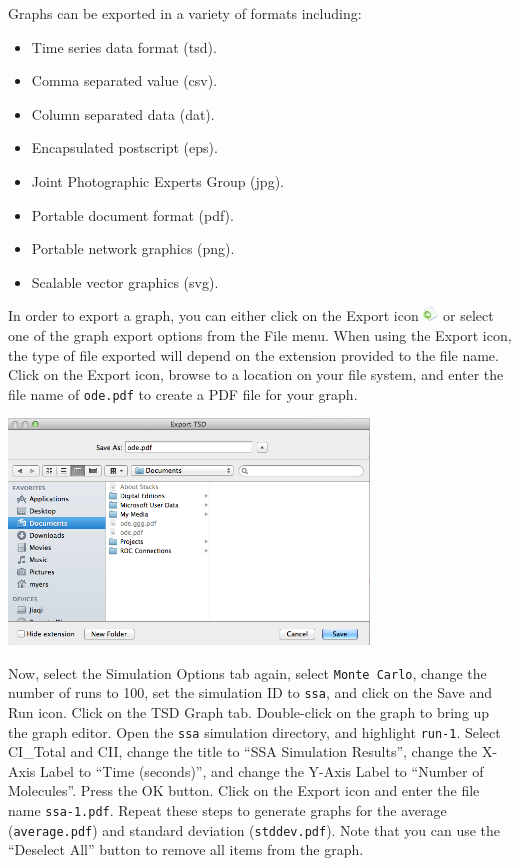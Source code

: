 \documentclass[titlepage,11pt]{article}
\begin{document}
Graphs can be exported in a variety of formats including:
\begin{itemize}
\item Time series data format (tsd).
\item Comma separated value (csv).
\item Column separated data (dat).
\item Encapsulated postscript (eps). 
\item Joint Photographic Experts Group (jpg). 
\item Portable document format (pdf).
\item Portable network graphics (png). 
\item Scalable vector graphics (svg).
\end{itemize}
In order to export a graph, you can either click on the Export icon \includegraphics{../gui/icons/export} or select one of the graph export options from the File menu.  When using the Export icon, the type of file exported will depend on the extension provided to the file name.  Click on the Export icon, browse to a location on your file system, and enter the file name of {\tt ode.pdf} to create a PDF file for your graph.

\begin{center}
\includegraphics[height=60mm]{screenshots/exportTSD}
\end{center}

Now, select the Simulation Options tab again, select {\tt Monte Carlo}, change the number of runs to 100, set the simulation ID to {\tt ssa}, and click on the Save and Run icon.  Click on the TSD Graph tab.  Double-click on the graph to bring up the graph editor.  Open the {\tt ssa} simulation directory, and highlight {\tt run-1}.  Select CI\_Total and CII, change the title to ``SSA Simulation Results'', change the X-Axis Label to ``Time (seconds)'', and change the Y-Axis Label to ``Number of Molecules''.  Press the OK button.  Click on the Export icon and enter the file name {\tt ssa-1.pdf}.  Repeat these steps to generate graphs for the average ({\tt average.pdf}) and standard deviation ({\tt stddev.pdf}).  Note that you can use the ``Deselect All'' button to remove all items from the graph.
\end{document}
